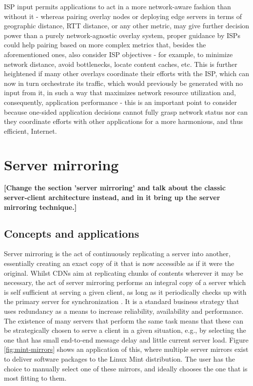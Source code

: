         ISP input permits applications to act in a more network-aware fashion than without it - whereas pairing overlay nodes or deploying edge servers in terms of geographic distance, RTT distance, or any other metric, may give further decision power than a purely network-agnostic overlay system, proper guidance by ISPs could help pairing based on more complex metrics that, besides the aforementioned ones, also consider ISP objectives - for example, to minimize network distance, avoid bottlenecks, locate content caches, etc.
        This is further heightened if many other overlays coordinate their efforts with the ISP, which can now in turn orchestrate its traffic, which would previously be generated with no input from it, in such a way that maximizes network resource utilization and, consequently, application performance - this is an important point to consider because one-sided application decisions cannot fully grasp network status nor can they coordinate efforts with other applications for a more harmonious, and thus efficient, Internet.


    \section{Server mirroring}

    \textbf{[Change the section 'server mirroring' and talk about the classic server-client architecture instead, and in it bring up the server mirroring technique.]}

    \subsection{Concepts and applications}

        Server mirroring is the act of continuously replicating a server into another, essentially creating an exact copy of it that is now accessible as if it were the original.
        Whilst CDNs aim at replicating chunks of contents wherever it may be necessary, the act of server mirroring performs an integral copy of a server which is self sufficient at serving a given client, as long as it periodically checks up with the primary server for synchronization .
        It is a standard business strategy that uses redundancy as a means to increase reliability, availability and performance.
        The existence of many servers that perform the same task means that these can be strategically chosen to serve a client in a given situation, e.g., by selecting the one that has small end-to-end message delay and little current server load.
        Figure \ref{fig:mint-mirrors} shows an application of this, where multiple server mirrors exist to deliver software packages to the Linux Mint distribution. The user has the choice to manually select one of these mirrors, and ideally chooses the one that is most fitting to them.

